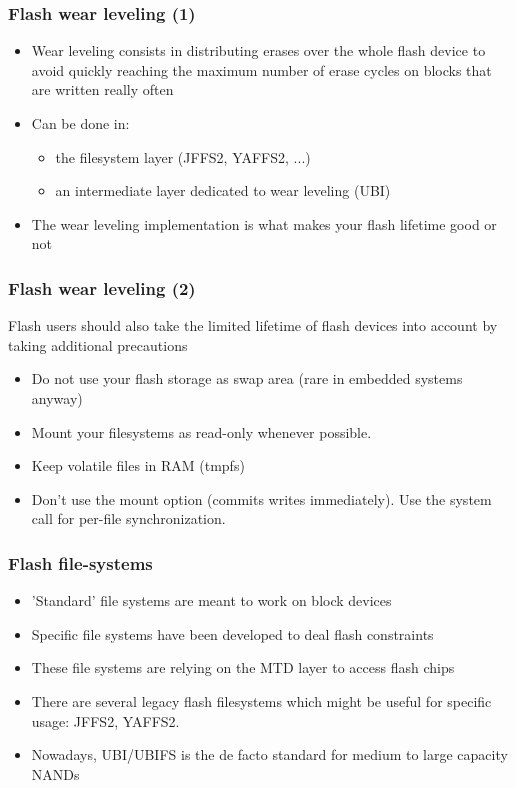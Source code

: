 \begin{frame}
  \frametitle{Flash wear leveling (1)}
  \begin{itemize}
  \item Wear leveling consists in distributing erases over the whole
    flash device to avoid quickly reaching the maximum number of erase
    cycles on blocks that are written really often
  \item Can be done in:
    \begin{itemize}
    \item the filesystem layer (JFFS2, YAFFS2, ...)
    \item an intermediate layer dedicated to wear leveling (UBI)
    \end{itemize}
  \item The wear leveling implementation is what makes your flash
    lifetime good or not
  \end{itemize}
\end{frame}

\begin{frame}
  \frametitle{Flash wear leveling (2)}
  Flash users should also take the limited lifetime of flash
  devices into account by taking additional precautions
  \begin{itemize}
  \item Do not use your flash storage as swap area (rare in embedded
    systems anyway)
  \item Mount your filesystems as read-only whenever possible.
  \item Keep volatile files in RAM (tmpfs)
  \item Don't use the  mount option (commits writes
    immediately). Use the  system call for per-file
    synchronization.
  \end{itemize}
\end{frame}

\begin{frame}
  \frametitle{Flash file-systems}
  \begin{itemize}
  \item 'Standard' file systems are meant to work on block devices
  \item Specific file systems have been developed to deal flash
    constraints
  \item These file systems are relying on the MTD layer to access
    flash chips
  \item There are several legacy flash filesystems which might be
    useful for specific usage: JFFS2, YAFFS2.
  \item Nowadays, UBI/UBIFS is the de facto standard for medium to
    large capacity NANDs
  \end{itemize}
\end{frame}

